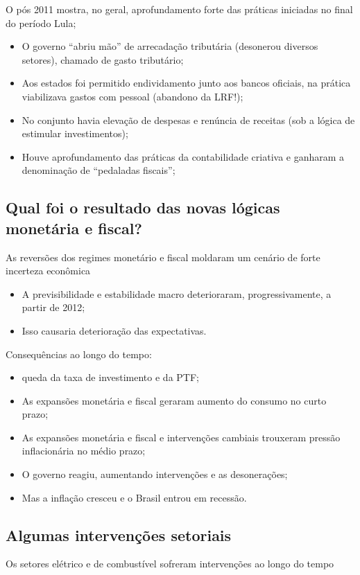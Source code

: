 \documentclass[a4paper,12pt]{article}[abntex2]
\begin{document}
O pós 2011 mostra, no geral, aprofundamento forte das práticas iniciadas no final do período Lula;

\begin{itemize}
    \item O governo “abriu mão” de arrecadação tributária (desonerou diversos setores), chamado de gasto tributário;
    \item Aos estados foi permitido endividamento junto aos bancos oficiais, na prática viabilizava gastos com pessoal (abandono da LRF!);
    \item No conjunto havia elevação de despesas e renúncia de receitas (sob a lógica de estimular investimentos);
    \item Houve aprofundamento das práticas da contabilidade criativa e ganharam a denominação de “pedaladas fiscais”;
\end{itemize}

\subsection{\textbf{Qual foi o resultado das novas lógicas monetária e fiscal?}}
As reversões dos regimes monetário e fiscal moldaram um cenário de forte incerteza econômica

\begin{itemize}
    \item A previsibilidade e estabilidade macro deterioraram, progressivamente, a partir de 2012;
    \item Isso causaria deterioração das expectativas.
\end{itemize}

Consequências ao longo do tempo:

\begin{itemize}
    \item queda da taxa de investimento e da PTF;
    \item As expansões monetária e fiscal geraram aumento do consumo no curto prazo;
    \item As expansões monetária e fiscal e intervenções cambiais trouxeram pressão inflacionária no médio prazo;
    \item O governo reagiu, aumentando intervenções e as desonerações;
    \item Mas a inflação cresceu e o Brasil entrou em recessão.
\end{itemize}

\subsection{\textbf{Algumas intervenções setoriais}}
Os setores elétrico e de combustível sofreram intervenções ao longo do tempo
\end{document}
